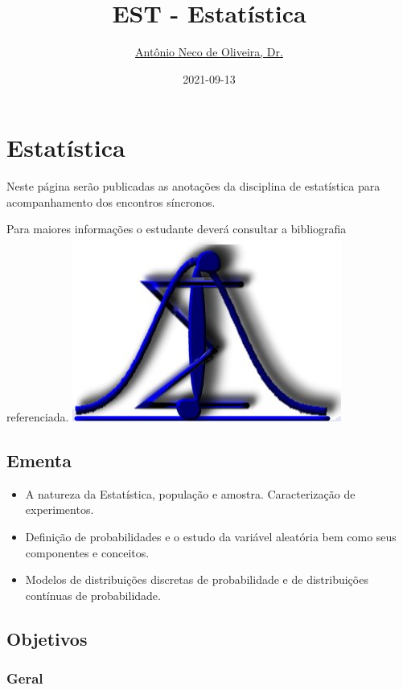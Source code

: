 \documentclass[
]{book}
\title{EST - Estatística}
\author{\href{}{Antônio Neco de Oliveira, Dr.}}
\date{2021-09-13}
\begin{document}
\maketitle

{
\setcounter{tocdepth}{1}
\tableofcontents
}
\hypertarget{estatuxedstica}{%
\chapter{Estatística}\label{estatuxedstica}}

Neste página serão publicadas as anotações da disciplina de estatística para acompanhamento dos encontros síncronos.

Para maiores informações o estudante deverá consultar a bibliografia referenciada.
\includegraphics{./img/simbolo.jpg}

\hypertarget{ementa}{%
\section{Ementa}\label{ementa}}

\begin{itemize}
\item
  A natureza da Estatística, população e amostra. Caracterização de experimentos.
\item
  Definição de probabilidades e o estudo da variável aleatória bem como seus componentes e conceitos.
\item
  Modelos de distribuições discretas de probabilidade e de distribuições contínuas de probabilidade.
\end{itemize}

\hypertarget{objetivos}{%
\section{Objetivos}\label{objetivos}}

\hypertarget{geral}{%
\subsection{Geral}\label{geral}}
\end{document}
